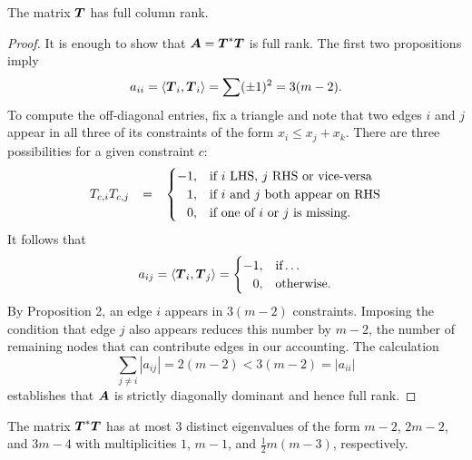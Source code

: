 \documentclass{article}
\begin{document}
\begin{proposition}
    The matrix \(\boldsymbol{T}\) has full column rank.
\end{proposition}
\begin{proof}
    It is enough to show that \(\boldsymbol{A} = \boldsymbol{T}^{\ast}\boldsymbol{T}\) is full rank.
    The first two propositions imply
    \begin{equation*}
        a_{ii}
        =
        \langle{\boldsymbol{T}_{i}, \boldsymbol{T}_{i}}\rangle
        =
        \sum (\pm 1)^{2}
        =
        3 (m-2).
    \end{equation*}
    To compute the off-diagonal entries, fix a triangle and note that two edges \(i\) and \(j\) appear in all three of its constraints of the form \(x_{i} \le x_{j} + x_{k}\).
    There are three possibilities for a given constraint \(c\):
    \begin{equation*}
        T_{c,i} T_{c,j} \mathop{\:\:\,}\nolimits = \mathop{\:\:\,}\nolimits
        \begin{cases}
            -1, &\text{if \(i\) LHS, \(j\) RHS or vice-versa} \\
            \mathop{\:\:\,}\nolimits 1,  &\text{if \(i\) and \(j\) both appear on RHS} \\
            \mathop{\:\:\,}\nolimits 0,  &\text{if one of \(i\) or \(j\) is missing}.
        \end{cases}
    \end{equation*}
    It follows that
    \begin{equation*}
        a_{ij}
        =
        \langle{\boldsymbol{T}_{i}, \boldsymbol{T}_{j}}\rangle
        =
        \begin{cases}
            -1, &\text{if}\ldots \\
            \mathop{\:\:\,}\nolimits 0, &\text{otherwise}.
        \end{cases}
    \end{equation*}
    By Proposition 2, an edge \(i\) appears in \(3 (m-2)\) constraints.
    Imposing the condition that edge \(j\) also appears reduces this number by \(m-2\), the number of remaining nodes that can contribute edges in our accounting.
    The calculation
    \begin{equation*}
        \sum_{j \neq i} |a_{ij}| = 2 (m-2) < 3 (m-2) = |a_{ii}|
    \end{equation*}
    establishes that \(\boldsymbol{A}\) is strictly diagonally dominant and hence full rank.
\end{proof}

\begin{proposition}
    The matrix \(\boldsymbol{T}^{\ast}\boldsymbol{T}\) has at most \(3\) distinct eigenvalues of the form \(m-2\), \(2m-2\), and \(3m-4\) with multiplicities \(1\), \(m-1\), and \(\frac{1}{2} m (m-3)\), respectively.
\end{proposition}
\end{document}
